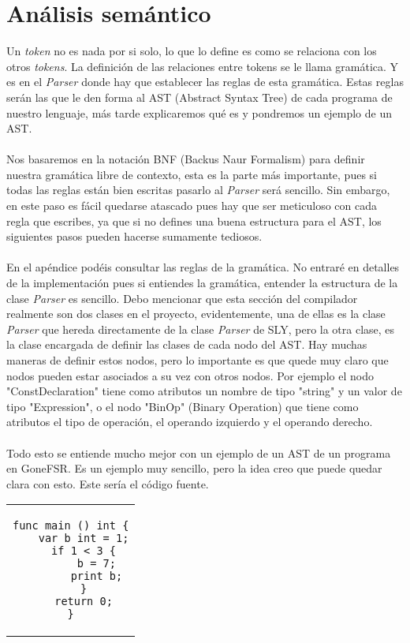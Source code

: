 \section{Análisis semántico}
Un \textit{token} no es nada por si solo, lo que lo define es como se relaciona con los otros \textit{tokens}. La definición de las relaciones entre tokens se le llama gramática. Y es en el \textit{Parser} donde hay que establecer las reglas de esta gramática. Estas reglas serán las que le den forma al AST (Abstract Syntax Tree) de cada programa de nuestro lenguaje, más tarde explicaremos qué es y pondremos un ejemplo de un AST.\\\\
Nos basaremos en la notación BNF (Backus Naur Formalism) para definir nuestra gramática libre de contexto, esta es la parte más importante, pues si todas las reglas están bien escritas pasarlo al \textit{Parser} será sencillo. Sin embargo, en este paso es fácil quedarse atascado pues hay que ser meticuloso con cada regla que escribes, ya que si no defines una buena estructura para el AST, los siguientes pasos pueden hacerse sumamente tediosos. \\\\
En el apéndice podéis consultar las reglas de la gramática. No entraré en detalles de la implementación pues si entiendes la gramática, entender la estructura de la clase \textit{Parser} es sencillo. Debo mencionar que esta sección del compilador realmente son dos clases en el proyecto, evidentemente, una de ellas es la clase \textit{Parser} que hereda directamente de la clase \textit{Parser} de SLY, pero la otra clase, es la clase encargada de definir las clases de cada nodo del AST. Hay muchas maneras de definir estos nodos, pero lo importante es que quede muy claro que nodos pueden estar asociados a su vez con otros nodos. Por ejemplo el nodo "ConstDeclaration" tiene como atributos un nombre de tipo "string" y un valor de tipo "Expression", o el nodo "BinOp" (Binary Operation) que tiene como atributos el tipo de operación, el operando izquierdo y el operando derecho.\\\\ 
Todo esto se entiende mucho mejor con un ejemplo de un AST de un programa en GoneFSR. Es un ejemplo muy sencillo, pero la idea creo que puede quedar clara con esto. Este sería el código fuente.
\begin{center}
\begin{tabular}{c}
\begin{lstlisting}
func main () int {
    var b int = 1;
    if 1 < 3 {
        b = 7;
        print b;
    }
    return 0;
}
\end{lstlisting}
\end{tabular}
\end{center}
